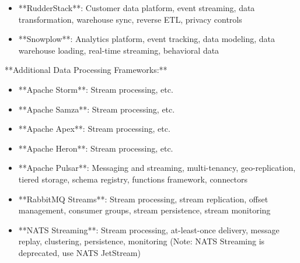 \documentclass[11pt,a4paper]{article}
\begin{document}
\begin{itemize}
\item **RudderStack**: Customer data platform, event streaming, data transformation, warehouse sync, reverse ETL, privacy controls
\end{itemize}

\begin{itemize}
\item **Snowplow**: Analytics platform, event tracking, data modeling, data warehouse loading, real-time streaming, behavioral data
\end{itemize}

**Additional Data Processing Frameworks:**

\begin{itemize}
\item **Apache Storm**: Stream processing, etc.
\end{itemize}

\begin{itemize}
\item **Apache Samza**: Stream processing, etc.
\end{itemize}

\begin{itemize}
\item **Apache Apex**: Stream processing, etc.
\end{itemize}

\begin{itemize}
\item **Apache Heron**: Stream processing, etc.
\end{itemize}

\begin{itemize}
\item **Apache Pulsar**: Messaging and streaming, multi-tenancy, geo-replication, tiered storage, schema registry, functions framework, connectors
\end{itemize}

\begin{itemize}
\item **RabbitMQ Streams**: Stream processing, stream replication, offset management, consumer groups, stream persistence, stream monitoring
\end{itemize}

\begin{itemize}
\item **NATS Streaming**: Stream processing, at-least-once delivery, message replay, clustering, persistence, monitoring (Note: NATS Streaming is deprecated, use NATS JetStream)
\end{itemize}
\end{document}
